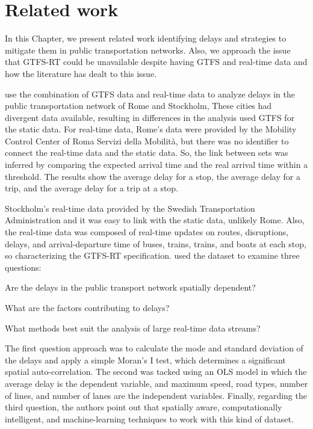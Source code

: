 \chapter{Related work}
\label{cap3}

\vspace{-1.9cm}


In this Chapter, we present related work identifying delays 
and strategies to mitigate them in public transportation networks.
Also, we approach the issue that GTFS-RT could be unavailable despite
having GTFS and real-time data and how the literature has dealt to
this issue.



 use the combination of GTFS data and real-time data
to analyze delays in the public transportation network of Rome and Stockholm, 
These cities had divergent data available, resulting in differences in the analysis
used GTFS for the static data. For real-time data,
Rome's data were provided by the Mobility Control Center of Roma Servizi
della Mobilità, but there was no identifier to connect the real-time data
and the static data. So, the link between sets was inferred by comparing the
expected arrival time and the real arrival time within a threshold. The 
results show the average delay for a stop, the average delay for a trip, 
and the average delay for a trip at a stop.

Stockholm's real-time data provided by the Swedish Transportation Administration
and it was easy to link with the static data, unlikely Rome. Also, the real-time
data was composed of real-time updates on routes, disruptions, delays, and 
arrival-departure time of buses, trains, trains, and boats at each stop, 
so characterizing the GTFS-RT specification.
 used the dataset to examine
three questions:
\begin{enumerate*}
    \item Are the delays in the public transport network spatially
dependent?
    \item What are the factors contributing to delays?
    \item What methods best suit the analysis of large
real-time data streams?
\end{enumerate*}
The first question approach was to calculate the mode and standard deviation
of the delays and apply a simple Moran's I test, which determines a
significant spatial auto-correlation.
The second was tacked using an OLS model in which the average delay is the dependent variable,
and maximum speed, road types, number of lines, and number of lanes are the
independent variables. Finally, regarding the third question, the authors point out 
that spatially aware, computationally intelligent, and machine-learning techniques
to work with this kind of dataset.

